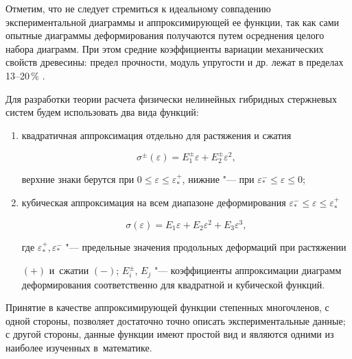 Отметим, что не следует стремиться к идеальному совпадению экспериментальной диаграммы и аппроксимирующей ее функции, так как сами опытные диаграммы деформирования получаются путем осреднения целого набора диаграмм. При этом средние коэффициенты вариации механических свойств древесины: предел прочности, модуль упругости и др. лежат в пределах 13--20\,\% \cite{GSSSD}.

Для разработки теории расчета физически нелинейных гибридных стержневых систем будем использовать два вида функций:



\begin{enumerate}

\item квадратичная аппроксимация \cite{Nemkonf} отдельно для растяжения и сжатия 

\begin{equation}\label{nem:kvadrataproximation}

\sigma^{\pm}\left(\varepsilon\right)=E^\pm_1\varepsilon+E^\pm_2\varepsilon^2,

\end{equation}

верхние знаки берутся при $0\le\varepsilon\le\varepsilon^+_{*}$, нижние "---  при  $\varepsilon^-_{*}\le\varepsilon\le0$;

\item кубическая аппроксимация \cite{NemkonfTomsk} на всем диапазоне деформирования $\varepsilon^-_{*}\le\varepsilon\le\varepsilon^+_{*}$ 

\begin{equation}\label{nem:kybaproximation}

\sigma\left(\varepsilon\right)=E_1\varepsilon+E_2\varepsilon^2+E_3\varepsilon^3,

\end{equation}



где $\varepsilon^+_*, \varepsilon^-_*$  "---  предельные значения продольных деформаций при растяжении

 $(+)$ и~сжатии $(-)$; $E^\pm_i$, $E_j$  "---  коэффициенты аппроксимации диаграмм деформирования соответственно для квадратной и кубической функций.

\end{enumerate}



Принятие в качестве аппроксимирующей функции степенных многочленов, с одной стороны, позволяет достаточно точно описать экспериментальные данные; с другой стороны, данные функции имеют простой вид и являются одними из наиболее изученных в~математике.



